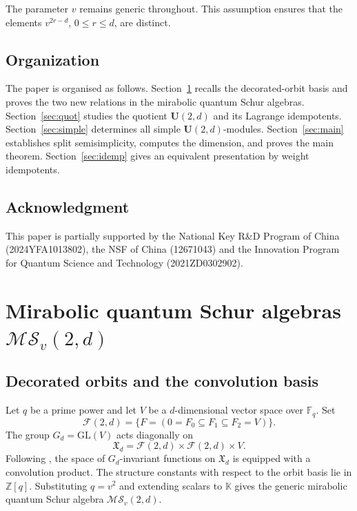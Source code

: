 \documentclass[12pt]{amsart}
\numberwithin{equation}{section}
\theoremstyle{definition}
\theoremstyle{definition}
\newcommand{\kk}{\mathbb K}
\newcommand{\Ufd}{\mathbf U(2,d)}
\newcommand{\MS}{\mathcal{MS}_v(2,d)}
\newcommand{\cF}{\mathcal F}
\begin{document}
The parameter $v$ remains generic throughout. This assumption ensures that the elements $v^{2r-d}$, $0\le r\le d$, are distinct.



\subsection{Organization} 
The paper is organised as follows. Section~\ref{sec:geom} recalls the decorated-orbit basis and proves the two new relations in the mirabolic quantum Schur algebras. Section~\ref{sec:quot} studies the quotient $\Ufd$ and its Lagrange idempotents. Section~\ref{sec:simple} determines all simple $\Ufd$-modules. Section~\ref{sec:main} establishes split semisimplicity, computes the dimension, and proves the main theorem. Section~\ref{sec:idemp} gives an equivalent presentation by weight idempotents.

\subsection*{Acknowledgment}
This paper is partially supported by the National Key R\&D Program of China (2024YFA1013802), the NSF of China (12671043) and the Innovation Program for Quantum Science and Technology (2021ZD0302902).




\section{Mirabolic quantum Schur algebras \texorpdfstring{$\MS$}{MS}}\label{sec:geom}
\subsection{Decorated orbits and the convolution basis}\label{subsec:orbits}

Let $q$ be a prime power and let $V$ be a $d$-dimensional vector space over $\mathbb F_q$. Set
$$
\cF(2,d)=
\{F=(0=F_0\subseteq F_1\subseteq F_2=V)\}.
$$
The group $G_d=\mathrm{GL}(V)$ acts diagonally on
$$
\mathfrak X_d=\cF(2,d)\times\cF(2,d)\times V.
$$
Following \cite[\S~2]{Ros18}, the space of $G_d$-invariant functions on $\mathfrak X_d$ is equipped with a convolution product. The structure constants with respect to the orbit basis lie in $\mathbb Z[q]$. Substituting $q=v^2$ and extending scalars to $\kk$ gives the generic mirabolic quantum Schur algebra $\MS$.
\end{document}
